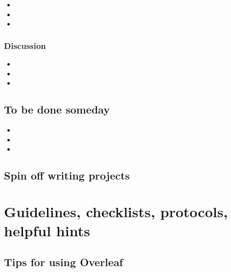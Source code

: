 \documentclass[10pt,letterpaper]{article}
\newcommand{\bi}{\begin{itemize}}
\newcommand{\ei}{\end{itemize}}
\begin{document}
\bi
    \item  
    \item  
    \item  
\ei

\subsubsection{Discussion}
\label{ssubsec:new-ideas:Discussion}

\bi
    \item  
    \item  
    \item  
\ei

\subsection{To be done someday}
\label{subsec:someday}



\bi
    \item  
    \item  
    \item  
\ei

\subsection{Spin off writing projects}
\label{subsec:spinoffs}

\begin{description}
    \item [ ]
    \item [ ]
    \item [ ]
    \item [ ]
\end{description}



\section{Guidelines, checklists, protocols, helpful hints}
\label{sec:guides}

\subsection{Tips for using Overleaf}
\label{subsec:guides:overleaf}
\end{document}
